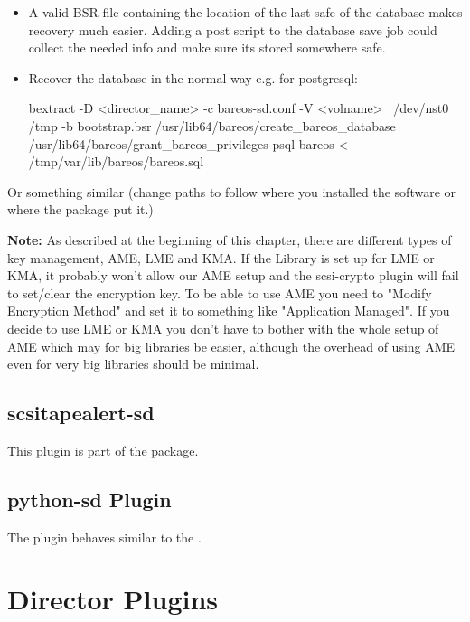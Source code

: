 \begin{itemize}
 \item A valid BSR file containing the location of the last safe of the database makes recovery much easier. Adding a post script to the database save job could collect the needed info and make sure its stored somewhere safe.
 \item Recover the database in the normal way e.g. for postgresql:
 \begin{commands}{}
 bextract -D <director_name> -c bareos-sd.conf -V <volname> \ /dev/nst0 /tmp -b bootstrap.bsr
 /usr/lib64/bareos/create_bareos_database
 /usr/lib64/bareos/grant_bareos_privileges
 psql bareos < /tmp/var/lib/bareos/bareos.sql
 \end{commands}
\end{itemize}

Or something similar (change paths to follow where you installed the software or where the package put it.)

\textbf{Note:} As described at the beginning of this chapter, there are different types of key management, AME, LME and KMA. If the Library is set up for LME or KMA, it probably won't allow our AME setup and the scsi-crypto plugin will fail to set/clear the encryption key. To be able to use AME you need to "Modify Encryption Method" and set it to something like "Application Managed". If you decide to use LME or KMA you don't have to bother with the whole setup of AME which may for big libraries be easier, although the overhead of using AME even for very big libraries should be minimal.

\subsection{scsitapealert-sd}

This plugin is part of the  package.


\subsection{python-sd Plugin}

The  plugin behaves similar to the .


\section{Director Plugins}
\label{dirPlugins}

